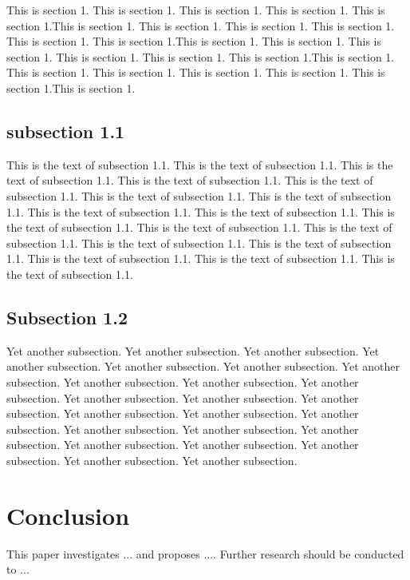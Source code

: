 \documentclass{da2pl2018}
\begin{document}
This is section 1. This is section 1. This is section 1. This is
section 1. This is section 1.This is section 1. This is section 1.
This is section 1. This is section 1. This is section 1. This is
section 1.This is section 1. This is section 1. This is section 1.
This is section 1. This is section 1. This is section 1.This is
section 1. This is section 1. This is section 1. This is section 1.
This is section 1. This is section 1.This is section 1.

\subsection{subsection 1.1}

 This is the text of  subsection 1.1. This is the text of  subsection 1.1.  This is the text of  subsection 1.1.  This is the text of  subsection 1.1. This is the text of  subsection 1.1.  This is the text of  subsection 1.1.
 This is the text of  subsection 1.1. This is the text of  subsection 1.1.  This is the text of  subsection 1.1.
 This is the text of  subsection 1.1. This is the text of  subsection 1.1.  This is the text of  subsection 1.1.
 This is the text of  subsection 1.1. This is the text of  subsection 1.1.  This is the text of  subsection 1.1.
 This is the text of  subsection 1.1.  This is the text of  subsection 1.1.






\subsection{Subsection 1.2}
\label{background2}


 Yet another subsection. Yet another subsection. Yet another
 subsection. Yet another subsection. Yet another subsection. Yet another
 subsection. Yet another subsection. Yet another subsection. Yet another
 subsection. Yet another subsection. Yet another subsection. Yet another
 subsection. Yet another subsection. Yet another subsection. Yet another
 subsection. Yet another subsection. Yet another subsection. Yet another
 subsection. Yet another subsection. Yet another subsection. Yet another
 subsection. Yet another subsection. Yet another subsection. Yet another subsection.



\section{Conclusion}
 \label{sec:conc}

 This paper investigates ... and proposes .... Further research
 should be conducted to ...


%
\end{document}

